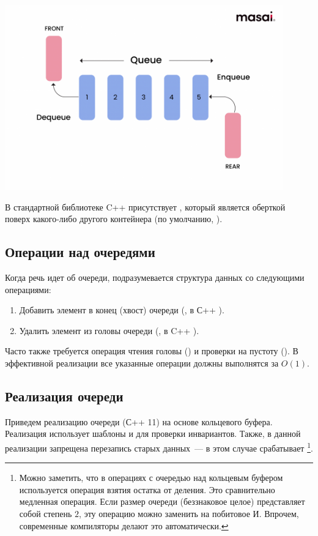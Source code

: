 \includegraphics[width=0.9\textwidth]{resources/19-26/queue.png}

В стандартной библиотеке C++ присутствует  , который является оберткой поверх
какого-либо другого контейнера (по умолчанию, ).

\subsection{Операции над очередями}
Когда речь идет об очереди, подразумевается структура данных со следующими операциями:
\begin{enumerate}
  \item Добавить элемент в конец (хвост) очереди (, в С++ ).
  \item Удалить элемент из головы очереди (, в C++ ).
\end{enumerate}
%
Часто также требуется операция чтения головы () и проверки на пустоту (). В эффективной реализации
все указанные операции должны выполнятся за \(O(1)\).

\subsection{Реализация очереди}
Приведем реализацию очереди (С++ 11) на основе кольцевого буфера. Реализация использует шаблоны и 
для проверки инвариантов. Также, в данной реализации запрещена перезапись старых данных~--- в этом случае срабатывает  \footnote{Можно заметить, что в операциях с очередью над кольцевым буфером используется операция взятия остатка от деления. Это сравнительно
  медленная операция. Если размер очереди (беззнаковое целое) представляет собой степень \(2\), эту операцию можно заменить на побитовое И. Впрочем, современные
  компиляторы делают это автоматически.}.

